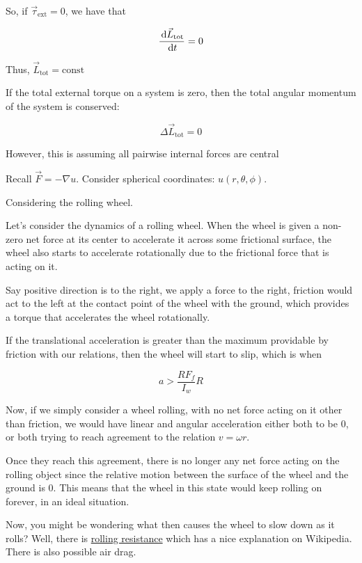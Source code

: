 So, if $\vec\tau_\mathrm{ext} = 0$, we have that

\begin{equation}
	\frac{\D \vec L_\mathrm{tot}}{\D t} = 0
\end{equation}

Thus, $\vec L_\mathrm{tot} = \text{const}$

\begin{theorem}
	If the total external torque on a system is zero, then the total angular momentum of the system is conserved:

	\begin{equation}
		\Delta \vec L_\mathrm{tot} = 0
	\end{equation}

	\begin{remark}
		However, this is assuming all pairwise internal forces are central
	\end{remark}
\end{theorem}

Recall $\vec F = -\nabla u$. Consider spherical coordinates: $u(r,\theta,\phi)$.

\begin{example}
	Considering the rolling wheel.
\end{example}

\begin{sol}
	Let's consider the dynamics of a rolling wheel. When the wheel is given a non-zero net force at its center to accelerate it across some frictional surface, the wheel also starts to accelerate rotationally due to the frictional force that is acting on it.

	Say positive direction is to the right, we apply a force to the right, friction would act to the left at the contact point of the wheel with the ground, which provides a torque that accelerates the wheel rotationally.

	If the translational acceleration is greater than the maximum providable by friction with our relations, then the wheel will start to slip, which is when

	\begin{equation}
		a > \frac{RF_f}{I_w}R
	\end{equation}

	Now, if we simply consider a wheel rolling, with no net force acting on it other than friction, we would have linear and angular acceleration either both to be 0, or both trying to reach agreement to the relation $v = \omega r$.

	Once they reach this agreement, there is no longer any net force acting on the rolling object since the relative motion between the surface of the wheel and the ground is 0. This means that the wheel in this state would keep rolling on forever, in an ideal situation.

	Now, you might be wondering what then causes the wheel to slow down as it rolls? Well, there is \href{https://en.wikipedia.org/wiki/Rolling_resistance}{rolling resistance} which has a nice explanation on Wikipedia. There is also possible air drag.
\end{sol}

